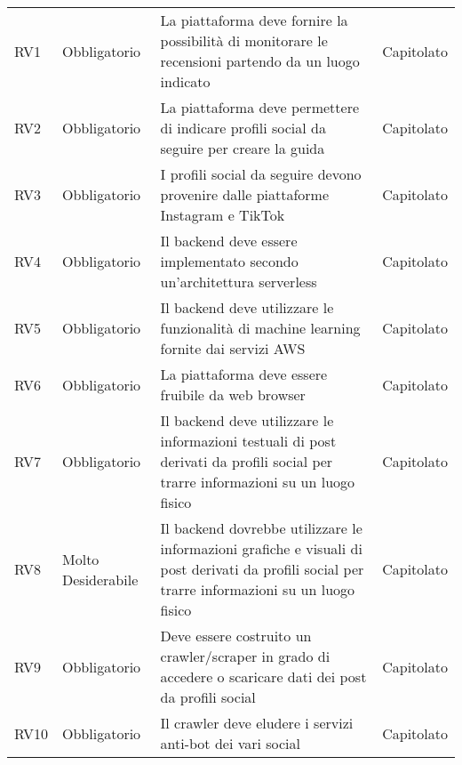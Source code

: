 {\begin{longtable}{C{.257\freewidth} C{.257\freewidth} C{.257\freewidth} C{.257\freewidth}}
      RV1 & Obbligatorio & La piattaforma deve fornire la possibilità di monitorare le recensioni partendo da un luogo indicato & Capitolato \\
      RV2 & Obbligatorio & La piattaforma deve permettere di indicare profili social da seguire per creare la guida & Capitolato \\
      RV3 & Obbligatorio & I profili social da seguire devono provenire dalle piattaforme Instagram e TikTok & Capitolato \\
      RV4 & Obbligatorio & Il backend deve essere implementato secondo un'architettura serverless & Capitolato \\
      RV5 & Obbligatorio & Il backend deve utilizzare le funzionalità di machine learning fornite dai servizi AWS & Capitolato \\
      RV6 & Obbligatorio & La piattaforma deve essere fruibile da web browser & Capitolato \\
      RV7 & Obbligatorio & Il backend deve utilizzare le informazioni testuali di post derivati da profili social per trarre informazioni su un luogo fisico & Capitolato \\
      RV8 & Molto Desiderabile & Il backend dovrebbe utilizzare le informazioni grafiche e visuali di post derivati da profili social per trarre informazioni su un luogo fisico & Capitolato \\
      RV9 & Obbligatorio & Deve essere costruito un crawler/scraper in grado di accedere o scaricare dati dei post da profili social & Capitolato \\
      RV10 & Obbligatorio & Il crawler deve eludere i servizi anti-bot dei vari social & Capitolato \\
      \bottomrule
      \end{longtable}
}
